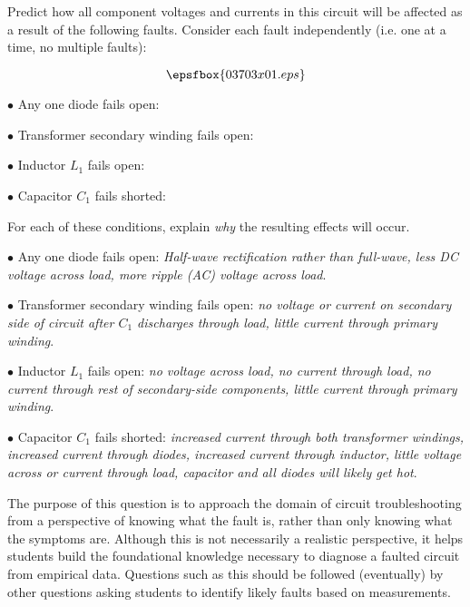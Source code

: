 

Predict how all component voltages and currents in this circuit will be affected as a result of the following faults.  Consider each fault independently (i.e. one at a time, no multiple faults):

$$\epsfbox{03703x01.eps}$$

\medskip
\item{$\bullet$} Any one diode fails open:
\vskip 5pt
\item{$\bullet$} Transformer secondary winding fails open:
\vskip 5pt
\item{$\bullet$} Inductor $L_1$ fails open:
\vskip 5pt
\item{$\bullet$} Capacitor $C_1$ fails shorted:
\medskip

For each of these conditions, explain {\it why} the resulting effects will occur.







\medskip
\item{$\bullet$} Any one diode fails open: {\it Half-wave rectification rather than full-wave, less DC voltage across load, more ripple (AC) voltage across load}.
\vskip 5pt
\item{$\bullet$} Transformer secondary winding fails open: {\it no voltage or current on secondary side of circuit after $C_1$ discharges through load, little current through primary winding}.
\vskip 5pt
\item{$\bullet$} Inductor $L_1$ fails open: {\it no voltage across load, no current through load, no current through rest of secondary-side components, little current through primary winding}.
\vskip 5pt
\item{$\bullet$} Capacitor $C_1$ fails shorted: {\it increased current through both transformer windings, increased current through diodes, increased current through inductor, little voltage across or current through load, capacitor and all diodes will likely get hot}.
\medskip







The purpose of this question is to approach the domain of circuit troubleshooting from a perspective of knowing what the fault is, rather than only knowing what the symptoms are.  Although this is not necessarily a realistic perspective, it helps students build the foundational knowledge necessary to diagnose a faulted circuit from empirical data.  Questions such as this should be followed (eventually) by other questions asking students to identify likely faults based on measurements.




